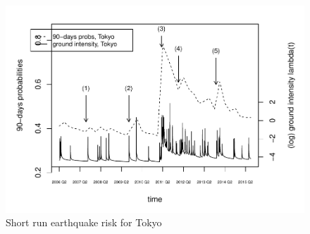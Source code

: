 \documentclass[
]{article}
\begin{document}
\begin{figure}
\centering
\includegraphics{replication_instructions_files/figure-latex/unnamed-chunk-5-1.pdf}
\caption{Short run earthquake risk for Tokyo}
\end{figure}
\end{document}
